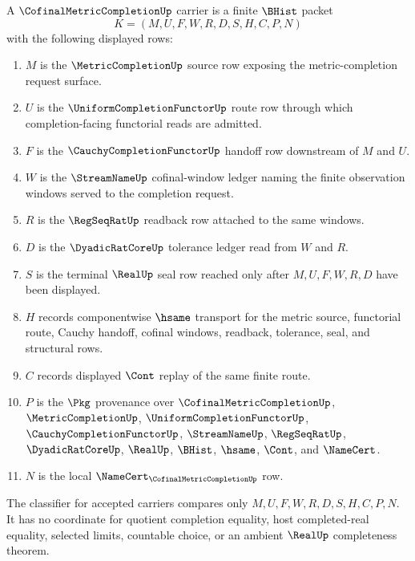 \begin{definition}
\label{def:cofinal-metric-completion-carrier}
A $\CofinalMetricCompletionUp$ carrier is a finite $\BHist$ packet
$$
K=(M,U,F,W,R,D,S,H,C,P,N)
$$
with the following displayed rows:
\begin{enumerate}
\item $M$ is the $\MetricCompletionUp$ source row exposing the metric-completion request surface.
\item $U$ is the $\UniformCompletionFunctorUp$ route row through which completion-facing functorial reads are admitted.
\item $F$ is the $\CauchyCompletionFunctorUp$ handoff row downstream of $M$ and $U$.
\item $W$ is the $\StreamNameUp$ cofinal-window ledger naming the finite observation windows served to the completion request.
\item $R$ is the $\RegSeqRatUp$ readback row attached to the same windows.
\item $D$ is the $\DyadicRatCoreUp$ tolerance ledger read from $W$ and $R$.
\item $S$ is the terminal $\RealUp$ seal row reached only after $M,U,F,W,R,D$ have been displayed.
\item $H$ records componentwise $\hsame$ transport for the metric source, functorial route, Cauchy handoff, cofinal windows, readback, tolerance, seal, and structural rows.
\item $C$ records displayed $\Cont$ replay of the same finite route.
\item $P$ is the $\Pkg$ provenance over $\CofinalMetricCompletionUp$, $\MetricCompletionUp$, $\UniformCompletionFunctorUp$, $\CauchyCompletionFunctorUp$, $\StreamNameUp$, $\RegSeqRatUp$, $\DyadicRatCoreUp$, $\RealUp$, $\BHist$, $\hsame$, $\Cont$, and $\NameCert$.
\item $N$ is the local $\NameCert_{\CofinalMetricCompletionUp}$ row.
\end{enumerate}
The classifier for accepted carriers compares only $M,U,F,W,R,D,S,H,C,P,N$. It has no coordinate for quotient completion equality, host completed-real equality, selected limits, countable choice, or an ambient $\RealUp$ completeness theorem.
\end{definition}

